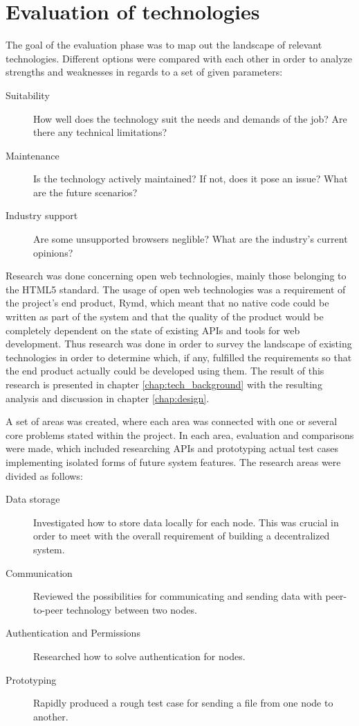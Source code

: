 \section{Evaluation of technologies}

The goal of the evaluation phase was to map out the landscape of relevant technologies. Different options were compared with each other in order to analyze strengths and weaknesses in regards to a set of given parameters:

\begin{description}
  \item[Suitability] How well does the technology suit the needs and demands of the job? Are there any technical limitations?
  \item[Maintenance] Is the technology actively maintained? If not, does it pose an issue? What are the future scenarios?
  \item[Industry support] Are some unsupported browsers neglible? What are the industry's current opinions?
\end{description}

Research was done concerning open web technologies, mainly those belonging to the HTML5 standard. The usage of open web technologies was a requirement of the project's end product, Rymd, which meant that no native code could be written as part of the system and that the quality of the product would be completely dependent on the state of existing APIs and tools for web development. Thus research was done in order to survey the landscape of existing technologies in order to determine which, if any, fulfilled the requirements so that the end product actually could be developed using them. The result of this research is presented in chapter \ref{chap:tech_background} with the resulting analysis and discussion in chapter \ref{chap:design}.

A set of areas was created, where each area was connected with one or several core problems stated within the project. In each area, evaluation and comparisons were made, which included researching APIs and prototyping actual test cases implementing isolated forms of future system features. The research areas were divided as follows:

\begin{description}
\item[Data storage] Investigated how to store data locally for each node. This was crucial in order to meet with the overall requirement of building a decentralized system.
\item[Communication] Reviewed the possibilities for communicating and sending data with peer-to-peer technology between two nodes.
\item[Authentication and Permissions] Researched how to solve authentication for nodes.
\item[Prototyping] Rapidly produced a rough test case for sending a file from one node to another.
\end{description}

